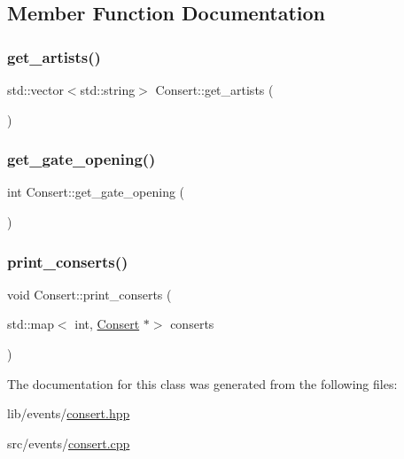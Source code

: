 \subsection{Member Function Documentation}
\mbox{\label{class_consert_a219d4bb1a948f744472ed0c06446d60d}} 
\subsubsection{\texorpdfstring{get\+\_\+artists()}{get\_artists()}}
{\footnotesize\ttfamily std\+::vector$<$std\+::string$>$ Consert\+::get\+\_\+artists (\begin{DoxyParamCaption}{ }\end{DoxyParamCaption})\hspace{0.3cm}{\ttfamily [inline]}}

\mbox{\label{class_consert_a7b2741a9c6388dc0221822456daf2d0e}} 
\subsubsection{\texorpdfstring{get\+\_\+gate\+\_\+opening()}{get\_gate\_opening()}}
{\footnotesize\ttfamily int Consert\+::get\+\_\+gate\+\_\+opening (\begin{DoxyParamCaption}{ }\end{DoxyParamCaption})\hspace{0.3cm}{\ttfamily [inline]}}

\mbox{\label{class_consert_a1f5f80b62ada3f9473e0ccb66d34d43f}} 
\subsubsection{\texorpdfstring{print\+\_\+conserts()}{print\_conserts()}}
{\footnotesize\ttfamily void Consert\+::print\+\_\+conserts (\begin{DoxyParamCaption}\item[{std\+::map$<$ int, \hyperlink{class_consert}{Consert} $\ast$$>$}]{conserts }\end{DoxyParamCaption})\hspace{0.3cm}{\ttfamily [static]}}



The documentation for this class was generated from the following files\+:\begin{DoxyCompactItemize}
\item 
lib/events/\hyperlink{consert_8hpp}{consert.\+hpp}\item 
src/events/\hyperlink{consert_8cpp}{consert.\+cpp}\end{DoxyCompactItemize}
